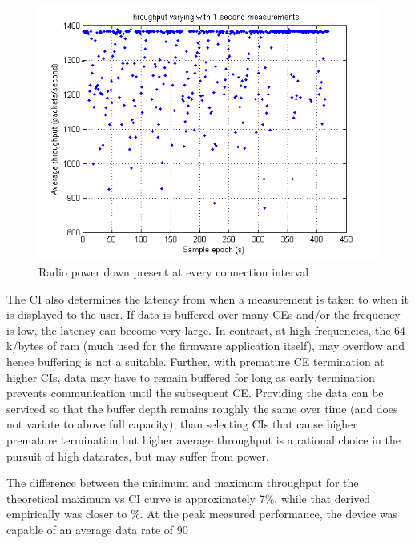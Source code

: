 \documentclass[]{article}
\begin{document}
\begin{figure}[H]
	\begin{center}
		\includegraphics[width = \textwidth]{60cithroughput}
	\end{center}
	\caption{Radio power down present at every connection interval}
	\label{fig:60cithroughput}
\end{figure}




The \ac{CI} also determines the latency from when a measurement is taken to when it is displayed to the user. If data is buffered over many \ac{CE}s and/or the frequency is low, the latency can become very large. In contrast, at high frequencies, the 64 k/bytes of ram (much used for the firmware application itself), may overflow and hence buffering is not a suitable. Further, with premature \ac{CE} termination at higher \ac{CI}s, data may have to remain buffered for long as early termination prevents communication until the subsequent \ac{CE}. Providing the data can be serviced so that the buffer depth remains roughly the same over time (and does not variate to above full capacity), than selecting \ac{CI}s that cause higher premature termination but higher average throughput is a rational choice in the pursuit of high datarates, but may suffer from power.  



The difference between the minimum and maximum throughput for the theoretical maximum vs \ac{CI} curve is approximately 7$\%$, while that derived empirically was closer to $\%$. At the peak measured performance, the device was capable of an average data rate of 90%
\end{document}
